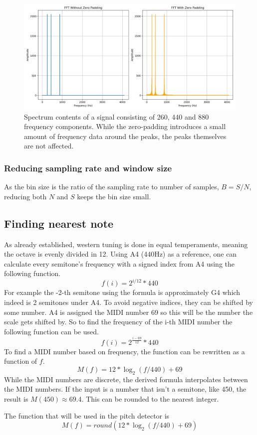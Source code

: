 \begin{figure}[ht]
    \centering
    \includegraphics[width=\textwidth]{./images/zero_pad_spectrum.png}
    \caption{Spectrum contents of a signal consisting of 260, 440 and 880 frequency components. While the zero-padding introduces a small amount of frequency data around the peaks, the peaks themselves are not affected. \label{fig:zeropadSpectrum}}
\end{figure}

\subsubsection{Reducing sampling rate and window size}
As the bin size is the ratio of the sampling rate to number of samples, $B = S/N$, reducing both $N$ and $S$ keeps the bin size small. 

\subsection{Finding nearest note}
As already established, western tuning is done in equal temperaments, meaning the octave is evenly divided in 12. Using A4 (440Hz) as a reference, one can calculate every semitone's frequency with a signed index from A4 using the following function. 
$$f(i) = 2^{i/12}*440$$
For example the -2-th semitone using the formula is approximately G4 which indeed is 2 semitones under A4. To avoid negative indices, they can be shifted by some number. A4 is assigned the MIDI number 69 so this will be the number the scale gets shifted by. So to find the frequency of the i-th MIDI number the following function can be used.
$$f(i) = 2^{\frac{i-69}{12}}*440$$
To find a MIDI number based on frequency, the function can be rewritten as a function of $f$.
$$M(f) = 12*\log_2(f/440)+69$$
While the MIDI numbers are discrete, the derived formula interpolates between the MIDI numbers. If the input is a number that isn't a semitone, like 450, the result is $M(450) \approx 69.4$. This can be rounded to the nearest integer.

The function that will be used in the pitch detector is
$$M(f) = round(12*\log_2(f/440)+69)$$


